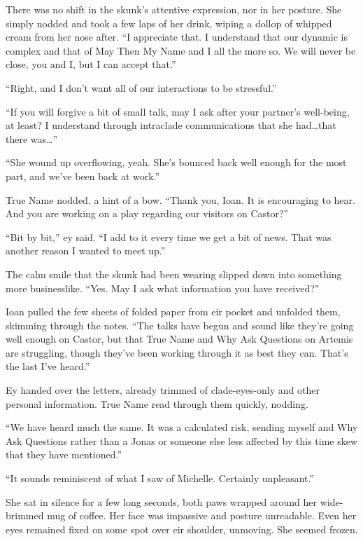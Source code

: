 There was no shift in the skunk's attentive expression, nor in her posture. She simply nodded and took a few laps of her drink, wiping a dollop of whipped cream from her nose after. ``I appreciate that. I understand that our dynamic is complex and that of May Then My Name and I all the more so. We will never be close, you and I, but I can accept that.''

``Right, and I don't want all of our interactions to be stressful.''

``If you will forgive a bit of small talk, may I ask after your partner's well-being, at least? I understand through intraclade communications that she had\ldots that there was\ldots{}''

``She wound up overflowing, yeah. She's bounced back well enough for the most part, and we've been back at work.''

True Name nodded, a hint of a bow. ``Thank you, Ioan. It is encouraging to hear. And you are working on a play regarding our visitors on Castor?''

``Bit by bit,'' ey said. ``I add to it every time we get a bit of news. That was another reason I wanted to meet up.''

The calm smile that the skunk had been wearing slipped down into something more businesslike. ``Yes. May I ask what information you have received?''

Ioan pulled the few sheets of folded paper from eir pocket and unfolded them, skimming through the notes. ``The talks have begun and sound like they're going well enough on Castor, but that True Name and Why Ask Questions on Artemis are struggling, though they've been working through it as best they can. That's the last I've heard.''

Ey handed over the letters, already trimmed of clade-eyes-only and other personal information. True Name read through them quickly, nodding.

``We have heard much the same. It was a calculated risk, sending myself and Why Ask Questions rather than a Jonas or someone else less affected by this time skew that they have mentioned.''

``It sounds reminiscent of what I saw of Michelle. Certainly unpleasant.''

She sat in silence for a few long seconds, both paws wrapped around her wide-brimmed mug of coffee. Her face was impassive and posture unreadable. Even her eyes remained fixed on some spot over eir shoulder, unmoving. She seemed frozen.

